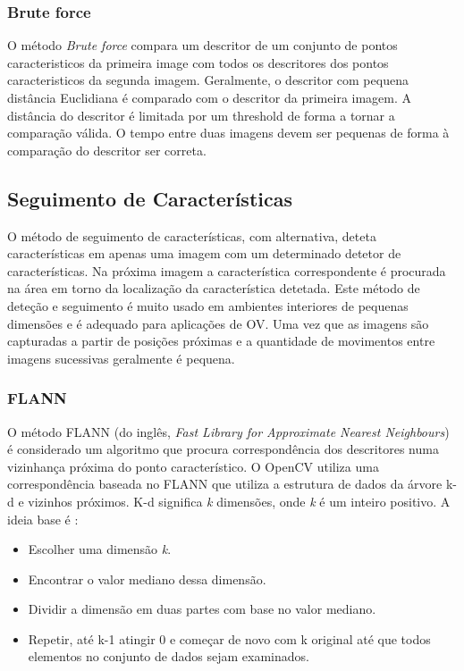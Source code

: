 \subsubsection{Brute force}\label{subchap:BRUTE}

O método \textit{Brute force} compara um descritor de um conjunto de pontos caracteristicos da primeira image com todos os descritores dos pontos caracteristicos da segunda imagem. Geralmente, o descritor com pequena distância Euclidiana é comparado com o descritor da primeira imagem. A distância do descritor é limitada por um threshold de forma a tornar a comparação válida. O tempo entre duas imagens devem ser pequenas de forma à comparação do descritor ser correta.


\subsection{Seguimento de Características}

O método de seguimento de características, com alternativa, deteta características em apenas uma imagem com um determinado detetor de características. Na próxima imagem a característica correspondente é procurada na área em torno da localização da característica detetada.
Este método de deteção e seguimento é muito usado em ambientes interiores de pequenas dimensões e é adequado para aplicações de OV. 
Uma vez que as imagens são capturadas a partir de posições próximas e a quantidade de movimentos entre imagens sucessivas geralmente é pequena. 

\subsubsection{FLANN}\label{subchap:FLANN}

O método FLANN (do inglês, \textit{Fast Library for Approximate Nearest Neighbours}) é considerado um algoritmo que procura correspondência dos descritores numa vizinhança próxima do ponto característico.  O OpenCV utiliza uma correspondência baseada no FLANN que utiliza a estrutura de dados da árvore k-d e vizinhos próximos. K-d significa \textit{k} dimensões, onde \textit{k} é um inteiro positivo. A ideia base é :
\begin{itemize}
	\item Escolher uma dimensão \textit{k}.
	\item Encontrar o valor mediano dessa dimensão.
	\item Dividir a dimensão em duas partes com base no valor mediano.
	\item Repetir, até k-1 atingir 0 e começar de novo com k original até que todos elementos no conjunto de dados sejam examinados.
\end{itemize}

